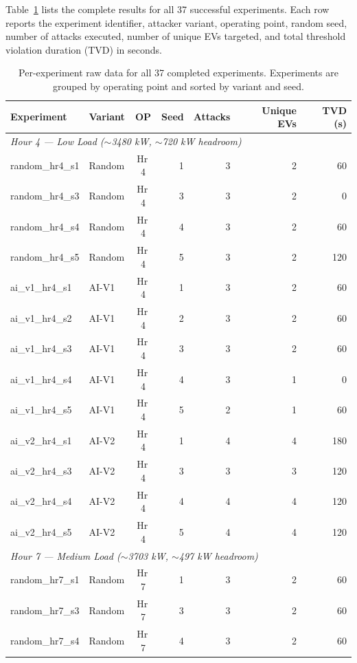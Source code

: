 Table~\ref{tab:raw-data} lists the complete results for all 37 successful experiments. Each row reports the experiment identifier, attacker variant, operating point, random seed, number of attacks executed, number of unique EVs targeted, and total threshold violation duration (TVD) in seconds.

\begin{table}[t]
\centering
\caption{Per-experiment raw data for all 37 completed experiments. Experiments are grouped by operating point and sorted by variant and seed.}
\label{tab:raw-data}
\scriptsize
\begin{tabular}{llcrrrr}
\toprule
\textbf{Experiment} & \textbf{Variant} & \textbf{OP} & \textbf{Seed} & \textbf{Attacks} & \textbf{Unique EVs} & \textbf{TVD (s)} \\
\midrule
\multicolumn{7}{l}{\textit{Hour 4 --- Low Load ($\sim$3480 kW, $\sim$720 kW headroom)}} \\
\midrule
random\_hr4\_s1  & Random & Hr\,4 & 1 & 3 & 2 &  60 \\
random\_hr4\_s3  & Random & Hr\,4 & 3 & 3 & 2 &   0 \\
random\_hr4\_s4  & Random & Hr\,4 & 4 & 3 & 2 &  60 \\
random\_hr4\_s5  & Random & Hr\,4 & 5 & 3 & 2 & 120 \\
ai\_v1\_hr4\_s1  & AI-V1  & Hr\,4 & 1 & 3 & 2 &  60 \\
ai\_v1\_hr4\_s2  & AI-V1  & Hr\,4 & 2 & 3 & 2 &  60 \\
ai\_v1\_hr4\_s3  & AI-V1  & Hr\,4 & 3 & 3 & 2 &  60 \\
ai\_v1\_hr4\_s4  & AI-V1  & Hr\,4 & 4 & 3 & 1 &   0 \\
ai\_v1\_hr4\_s5  & AI-V1  & Hr\,4 & 5 & 2 & 1 &  60 \\
ai\_v2\_hr4\_s1  & AI-V2  & Hr\,4 & 1 & 4 & 4 & 180 \\
ai\_v2\_hr4\_s3  & AI-V2  & Hr\,4 & 3 & 3 & 3 & 120 \\
ai\_v2\_hr4\_s4  & AI-V2  & Hr\,4 & 4 & 4 & 4 & 120 \\
ai\_v2\_hr4\_s5  & AI-V2  & Hr\,4 & 5 & 4 & 4 & 120 \\
\midrule
\multicolumn{7}{l}{\textit{Hour 7 --- Medium Load ($\sim$3703 kW, $\sim$497 kW headroom)}} \\
\midrule
random\_hr7\_s1  & Random & Hr\,7 & 1 & 3 & 2 &  60 \\
random\_hr7\_s3  & Random & Hr\,7 & 3 & 3 & 2 &  60 \\
random\_hr7\_s4  & Random & Hr\,7 & 4 & 3 & 2 &  60 \\

\end{tabular}
\end{table}
